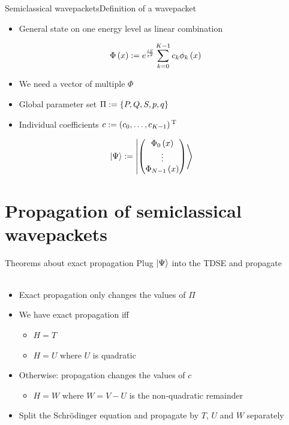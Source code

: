 \documentclass{beamer}
\begin{document}
\begin{frame}{Semiclassical wavepackets}{Definition of a wavepacket}
  \begin{itemize}
  \item General state on one energy level as linear combination
  \end{itemize}
  \begin{equation*} \label{eq:hawp_def_single}
    \Phi\left( x \right) := e^{\frac{iS}{\varepsilon^2}} \sum_{k=0}^{K-1} c_k \phi_k \left( x \right)
  \end{equation*}
  \begin{itemize}
  \item We need a vector of multiple $\Phi$
  \item Global parameter set $\Pi := \{P, Q, S, p, q\}$
  \item Individual coefficients $c := \left(c_0, \ldots, c_{K-1}\right){}^{\textnormal{T}}$
  \end{itemize}
  \begin{align*} \label{eq:hawp_def_state_vector}
    \Ket{\Psi} & := \Ket{ \begin{pmatrix}
        \Phi_0\left( x \right) \\
        \vdots \\
        \Phi_{N-1}\left( x \right) \\
      \end{pmatrix}}
  \end{align*}
\end{frame}


\section{Propagation of semiclassical wavepackets}


\begin{frame}{Theorems about exact propagation}
  Plug $\Ket{\Psi}$ into the TDSE and propagate \\~ \\
  \begin{itemize}
  \item Exact propagation only changes the values of $\Pi$
  \item We have exact propagation iff
    \begin{itemize}
    \item $H = T$
    \item $H = U$ where $U$ is quadratic
    \end{itemize}
  \item Otherwise: propagation changes the values of $c$
    \begin{itemize}
    \item $H = W$ where $W = V - U$ is the non-quadratic remainder
    \end{itemize}
  \item Split the Schrödinger equation and propagate by $T$, $U$ and $W$ separately
  \end{itemize}
\end{frame}
\end{document}
